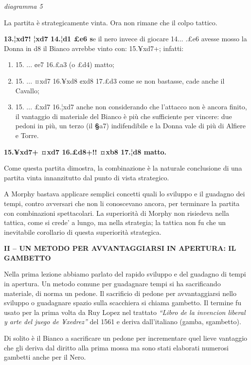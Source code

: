\documentclass[
]{article}
\begin{document}
\emph{diagramma 5}

La partita è strategicamente vinta. Ora non rimane che il colpo tattico.

\textbf{13.¦xd7! ¦xd7 14.¦d1 £e6 s}e il nero invece di giocare 14...
.£e6 avesse mosso la Donna in d8 il Bianco avrebbe vinto con: 15.¥xd7+;
infatti:

\begin{enumerate}
\def\labelenumi{\alph{enumi})}
\item
  15. ... ¢e7 16.£a3 (o £d4) matto;
\item
  15. ... ¤xd7 16.¥xd8 ¢xd8 17.£d3 come se non bastasse, cade anche il
  Cavallo;
\item
  15. ... £xd7 16.¦xd7 anche non considerando che l'attacco non è ancora
  finito, il vantaggio di materiale del Bianco è più che sufficiente per
  vincere: due pedoni in più, un terzo (il \textbf{§}a7) indifendibile e
  la Donna vale di più di Alfiere e Torre.
\end{enumerate}

\textbf{15.¥xd7+ ¤xd7 16.£d8+!! ¤xb8 17.¦d8 matto.}

Come questa partita dimostra, la combinazione è la naturale conclusione
di una partita vinta innanzitutto dal punto di vista strategico.

A Morphy bastava applicare semplici concetti quali lo sviluppo e il
guadagno dei tempi, contro avversari che non li conoscevano ancora, per
terminare la partita con combinazioni spettacolari. La superiorità di
Morphy non risiedeva nella tattica, come si crede' a lungo, ma nella
strategia; la tattica non fu che un inevitabile corollario di questa
superiorità strategica.

\textbf{II -- UN METODO PER AVVANTAGGIARSI IN APERTURA: IL GAMBETTO}

Nella prima lezione abbiamo parlato del rapido sviluppo e del guadagno
di tempi in apertura. Un metodo comune per guadagnare tempi si ha
sacrificando materiale, di norma un pedone. Il sacrificio di pedone per
avvantaggiarsi nello sviluppo o guadagnare spazio sulla scacchiera si
chiama gambetto. Il termine fu usato per la prima volta da Ruy Lopez nel
trattato \emph{``Libro de la invencion liberal y arte del juego de
¥xedrez''} del 1561 e deriva dall'italiano (gamba, sgambetto).

Di solito è il Bianco a sacrificare un pedone per incrementare quel
lieve vantaggio che gli deriva dal diritto alla prima mossa ma sono
stati elaborati numerosi gambetti anche per il Nero.
\end{document}
